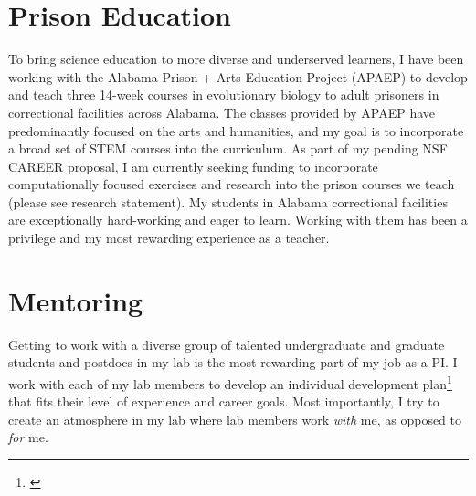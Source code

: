 \section*{Prison Education}
To bring science education to more diverse and underserved learners,
I have been working with
the Alabama Prison + Arts Education Project (APAEP) to develop and teach three
14-week courses in evolutionary biology to adult prisoners in correctional
facilities across Alabama.
The classes provided by APAEP have predominantly focused on the
arts and humanities, and
my
goal is to incorporate a broad set of STEM courses into the
curriculum.
As part of my pending NSF CAREER proposal, I am currently
seeking funding to incorporate computationally focused
exercises and research into the prison courses we teach
(please see research statement).
My students in Alabama correctional facilities are exceptionally hard-working
and eager to learn.
Working with them has been a privilege and my most rewarding experience as a
teacher.

\section*{Mentoring}
Getting to work with a diverse group of talented undergraduate and graduate
students and postdocs in my lab is the most rewarding part of my job as a
PI.
I work with each of my lab members to develop an individual development
plan\footnote{\label{idp}} that fits
their level of experience and career goals.
Most importantly, I try to create an atmosphere in my lab where
lab members work \emph{with} me, as opposed to \emph{for} me.

